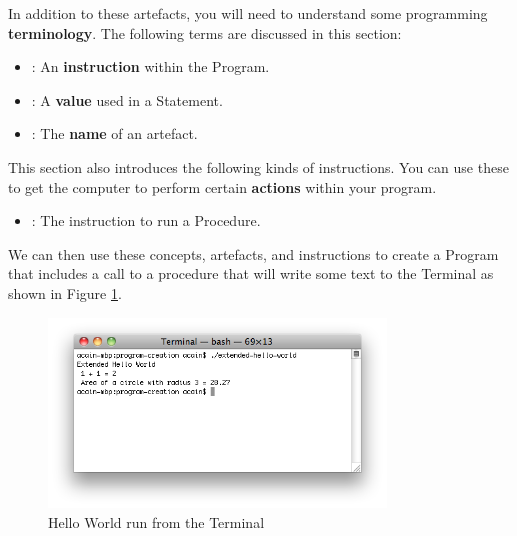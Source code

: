 In addition to these artefacts, you will need to understand some programming \textbf{terminology}. The following terms are discussed in this section:
\begin{itemize}
  \item {}: An \textbf{instruction} within the Program.
  \item {}: A \textbf{value} used in a Statement.
  \item {}: The \textbf{name} of an artefact.
\end{itemize}

This section also introduces the following kinds of instructions. You can use these to get the computer to perform certain \textbf{actions} within your program.
\begin{itemize}
  \item {}: The instruction to run a Procedure.
\end{itemize}

We can then use these concepts, artefacts, and instructions to create a Program that includes a call to a procedure that will write some text to the Terminal as shown in Figure \ref{fig:program-creation-helloworld}.

\begin{figure}[h]
   \centering
   \includegraphics[width=0.8\textwidth]{./topics/program-creation/images/HelloWorld} 
   \caption[Hello World Terminal]{Hello World run from the Terminal}
   \label{fig:program-creation-helloworld}
\end{figure}






% 





